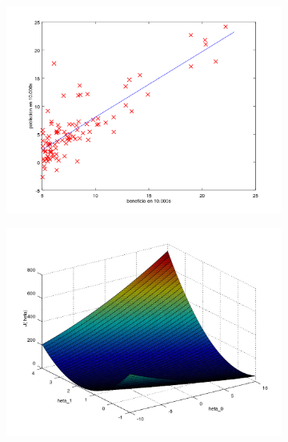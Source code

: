 \documentclass{article}
\begin{document}
\begin{figure}
\begin{subfigure}{0.5\textwidth}
\includegraphics[width=\linewidth]{rectaRegresion}
\caption{}
\label{fig:recta}
\end{subfigure}
\begin{subfigure}{0.5\textwidth}
\includegraphics[width=\linewidth]{surfaceCoste}
\caption{}
\label{fig:coste}
\end{subfigure}


\end{figure}
\end{document}
